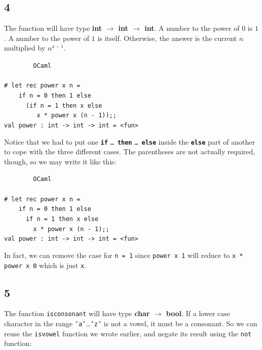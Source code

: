 \documentclass[]{book}
\newcommand{\smspace}{\vspace{4mm}}
\begin{document}
\subsection*{4}
The function will have type \textsf{\textbf{int $\rightarrow$ int $\rightarrow$ int}}. A number to the power of $0$ is $1$. A number to the power of $1$ is itself. Otherwise, the answer is the current $n$ multiplied by $n^{x - 1}$.

\smspace
\noindent\verb!        OCaml!\\
\noindent\\
\noindent\verb!# let rec power x n =!\\
\noindent\verb!    if n = 0 then 1 else!\\
\noindent\verb!      (if n = 1 then x else!\\
\noindent\verb!         x * power x (n - 1));;!\\
\noindent\verb!val power : int -> int -> int = <fun>!
\smspace

\noindent Notice that we had to put one \textbf{\texttt{if}} \texttt{\ldots\ }\textbf{\texttt{then}} \texttt{\ldots\ }\textbf{\texttt{else}} inside the \textbf{\texttt{else}} part of another to cope with the three different cases. The parentheses are not actually required, though, so we may write it like this:

\smspace
\noindent\verb!        OCaml!\\
\noindent\\
\noindent\verb!# let rec power x n =!\\
\noindent\verb!    if n = 0 then 1 else!\\
\noindent\verb!      if n = 1 then x else!\\
\noindent\verb!        x * power x (n - 1);;!\\
\noindent\verb!val power : int -> int -> int = <fun>!
\smspace

\noindent In fact, we can remove the case for \texttt{n = 1} since \texttt{power x 1} will reduce to \texttt{x * power x 0} which is just \texttt{x}.

\subsection*{5}
The function \texttt{isconsonant} will have type \textbf{\textsf{char $\rightarrow$ bool}}. If a lower case character in the range \texttt{'a'}\ldots\texttt{'z'} is not a vowel, it must be a consonant. So we can reuse the \texttt{isvowel} function we wrote earlier, and negate its result using the \texttt{not} function:
\end{document}
